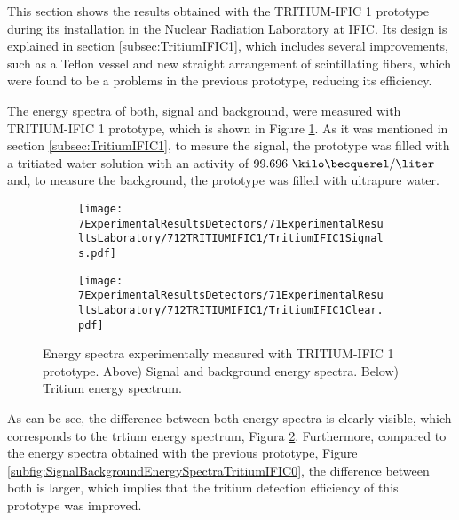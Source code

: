 This section shows the results obtained with the TRITIUM-IFIC 1 prototype  during its installation in the Nuclear Radiation Laboratory at IFIC. Its design is explained in section \ref{subsec:TritiumIFIC1}, which includes several improvements, such as a Teflon vessel and new straight arrangement of scintillating fibers, which were found to be a problems in the previous prototype, reducing its efficiency.

The energy spectra of both, signal and background, were measured with TRITIUM-IFIC 1 prototype, which is shown in Figure \ref{subfig:SignalBackgroundEnergySpectraTritiumIFIC1}. As it was mentioned in section \ref{subsec:TritiumIFIC1}, to mesure the signal, the prototype was filled with a tritiated water solution with an activity of $99.696~\kilo\becquerel/\liter$ and, to measure the background, the prototype was filled with ultrapure water.

\begin{figure}
\centering
    \begin{subfigure}[b]{1\textwidth}
    \centering
    \texttt{[image: 7ExperimentalResultsDetectors/71ExperimentalResultsLaboratory/712TRITIUMIFIC1/TritiumIFIC1Signals.pdf]}  
    \caption{\label{subfig:SignalBackgroundEnergySpectraTritiumIFIC1}}
    \end{subfigure}
    \hfill
    \begin{subfigure}[b]{1\textwidth}
    \centering
    \texttt{[image: 7ExperimentalResultsDetectors/71ExperimentalResultsLaboratory/712TRITIUMIFIC1/TritiumIFIC1Clear.pdf]}  
    \caption{\label{subfig:TritiumEnergySpectraTritiumIFIC1}}
    \end{subfigure}
 \caption{Energy spectra experimentally measured with TRITIUM-IFIC 1 prototype. Above) Signal and background energy spectra. Below) Tritium energy spectrum.}
 \label{fig:EnergySpectraTRITIUMIFIC1}
\end{figure}


As can be see, the difference between both energy spectra is clearly visible, which corresponds to the trtium energy spectrum, Figura \ref{subfig:TritiumEnergySpectraTritiumIFIC1}. Furthermore, compared to the energy spectra obtained with the previous prototype, Figure \ref{subfig:SignalBackgroundEnergySpectraTritiumIFIC0}, the difference between both is larger, which implies that the tritium detection efficiency of this prototype was improved.

